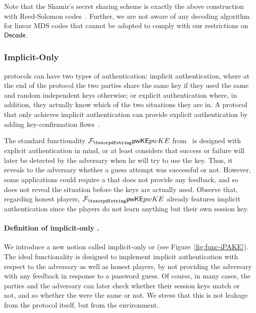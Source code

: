 Note that the Shamir's secret sharing scheme is exactly the above construction with Reed-Solomon codes~\cite{DBLP:journals/cacm/McElieceS81}. Further, we are not aware of any decoding algorithm for linear MDS codes that cannot be adopted to comply with our restrictions on $\mathsf{Decode}$.

\subsubsection{Implicit-Only \PAKE}
\label{sec:lipake}

\PAKE protocols can have two types of authentication: implicit authentication, where at the end of the protocol the two parties share the same key if they used the same \password and random independent keys otherwise; or explicit authentication where, in addition, they actually know which of the two situations they are in.
A \PAKE protocol that only achieves implicit authentication can provide explicit authentication by adding key-confirmation flows~\cite{EC:BelPoiRog00}.

The standard \PAKE functionality $\FpwKE$ from~\cite{EC:CHKLM05}\iftoggle{full}{ (see Figure~\ref{fig:func-PAKE})}{} is designed with explicit authentication in mind, or at least considers that  success or failure will later be detected by the adversary when he will try to use the key. Thus, it reveals to the adversary whether a \password guess attempt was successful or not. However, some applications could require a \PAKE that does not provide any feedback, and so does not reveal the situation before the keys are actually used. Observe that, regarding honest players, $\FpwKE$ already features implicit authentication since the players do not learn anything but their own session key.

\paragraph{Definition of implicit-only \PAKE.}
We introduce a new notion called implicit-only \PAKE or \iPAKE (see Figure~\ref{fig:func-iPAKE}). 
The \iPAKE ideal functionality is designed to implement implicit authentication with respect to the adversary as well as honest players,  by not providing the adversary with any feedback in response to a password guess.
Of course, in many cases, the parties and the adversary can later check whether their session keys match or not, and so whether the \passwords were the same or not. 
We stress that this is not leakage from the \PAKE protocol itself, but from the environment. 


